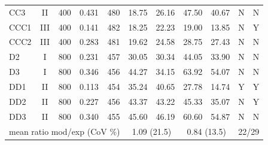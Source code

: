 \begin{tabular}{l c r c r cc cc cc}
CC3 & II & 400 & 0.431 & 480 & 18.75 & 26.16 & 47.50 & 40.67 & N & N\\
CCC1 & III & 400 & 0.141 & 482 & 18.25 & 22.23 & 19.00 & 13.85 & N & Y\\
CCC2 & III & 400 & 0.283 & 481 & 19.62 & 24.58 & 28.75 & 27.43 & N & N\\
D2 & I & 800 & 0.231 & 457 & 30.05 & 30.34 & 44.05 & 33.90 & N & N\\
D3 & I & 800 & 0.346 & 456 & 44.27 & 34.15 & 63.92 & 54.07 & N & N\\
DD1 & II & 800 & 0.113 & 454 & 35.24 & 40.65 & 27.78 & 14.74 & Y & Y\\
DD2 & II & 800 & 0.227 & 456 & 43.37 & 43.22 & 45.33 & 35.07 & N & Y\\
DD3 & II & 800 & 0.340 & 455 & 45.60 & 46.19 & 60.60 & 54.87 & N & N\\
\midrule
\multicolumn{5}{l}{mean ratio mod/exp (CoV \%)} & \multicolumn{2}{c}{1.09 (21.5)} & \multicolumn{2}{c}{0.84 (13.5)} & \multicolumn{2}{c}{22/29}\\
\bottomrule
\end{tabular}

